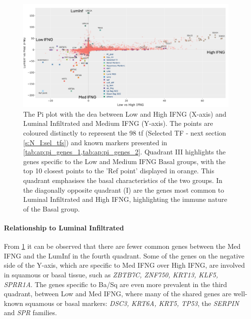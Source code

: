 \begin{figure}[H]    
    \centering
    \includegraphics[width=1.0\textwidth,keepaspectratio]{Sections/ClusteringAnalysis/Resources/discussion/basal_inf_pi.png}
    \caption[Pi plot - basal groups and immune infiltration]{The Pi plot with the \acrshort{dea} between Low and High IFNG (X-axis) and Luminal Infiltrated and Medium IFNG (Y-axis). The points are coloured distinctly to represent the 98 \acrlong{tf} (Selected TF - next section \cref{s:N_I:sel_tfs}) and known markers presented in \cref{tab:ap:pi_genes_1,tab:ap:pi_genes_2}. Quadrant III highlights the genes specific to the Low and Medium IFNG Basal groups, with the top 10 closest points to the 'Ref point' displayed in orange. This quadrant emphasises the basal characteristics of the two groups. In the diagonally opposite quadrant (I) are the genes most common to Luminal Infiltrated and High IFNG, highlighting the immune nature of the Basal group.}
    \label{fig:cs:pi_basal_inf}
\end{figure}


\paragraph*{Relationship to Luminal Infiltrated}

From \cref{fig:cs:pi_basal_inf} it can be observed that there are fewer common genes between the Med IFNG and the LumInf in the fourth quadrant. Some of the genes on the negative side of the Y-axis, which are specific to Med IFNG over High IFNG, are involved in squamous or basal tissue, such as \textit{ZBTB7C, ZNF750, KRT13, KLF5, SPRR1A}. The genes specific to Ba/Sq are even more prevalent in the third quadrant, between Low and Med IFNG, where many of the shared genes are well-known squamous or basal markers: \textit{DSC3, KRT6A, KRT5, TP53}, the \textit{SERPIN} and \textit{SPR} families.

